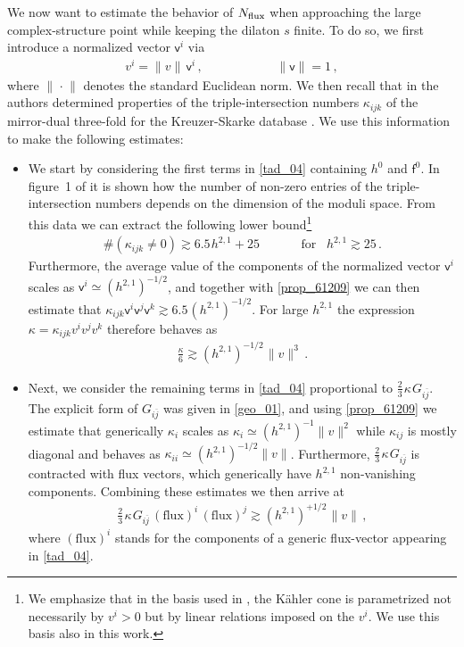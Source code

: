 \documentclass[12pt,a4paper]{article}
\newcommand{\eq}[1]{\begin{equation}
                     \begin{split} #1 \end{split}
                     \end{equation}}
\newcommand{\ov}{\overline}
\newcommand{\op}{\hspace{1pt}}
\numberwithin{equation}{section}
\begin{document}
We now want to estimate the behavior of $N_{\rm flux}$ when approaching the 
large com\-plex-structure point while keeping the dilaton $s$ finite. 
To do so, we first introduce a normalized vector $\mathsf v^i$ via
\eq{
  v^i =  \lVert v \rVert\, \mathsf v^i \,, \hspace{70pt} \lVert \mathsf v \rVert =1\,,
}
where  $\lVert\op \cdot\op\rVert$ denotes  the standard Euclidean norm. 
We then recall that  in \cite{Demirtas:2018akl} the authors determined properties of the 
triple-intersection numbers $\kappa_{ijk}$ of the mirror-dual three-fold 
for the Kreuzer-Skarke database \cite{Kreuzer:2000xy}. We use this information to make the following estimates:
\begin{itemize}


\item We start by considering the first terms in \eqref{tad_04} containing $h^0$ and $\mathsf f^0$. 
In figure~1 of  \cite{Demirtas:2018akl} it is shown
how the number of non-zero entries of the triple-intersection numbers depends 
on the dimension of the moduli space. From this data we can extract the following lower bound\footnote{
We emphasize that in the basis used in \cite{Demirtas:2018akl}, the K\"ahler cone is 
parametrized not necessarily by $v^i>0$ but by linear relations imposed on the $v^i$. We use this basis also in this work.}
\eq{
  \label{prop_61209}
  \#(\kappa_{ijk}\neq 0) \gtrsim 6.5\op h^{2,1} + 25
  \hspace{40pt}\mbox{for}\hspace{10pt} h^{2,1} \gtrsim 25 \,.
}
Furthermore, the average value of the components of the normalized vector $\mathsf v^i$ scales as
$\mathsf v^i \simeq (h^{2,1})^{-1/2}$, and together with 
\eqref{prop_61209} we can then estimate that
$\kappa_{ijk} \mathsf v^i \mathsf v^j \mathsf v^k \gtrsim 6.5 \op (h^{2,1})^{-1/2}$.
For large $h^{2,1}$ the expression $ \kappa = \kappa_{ijk} v^i v^j v^k$ therefore behaves as
\eq{
  \label{scaling_kappa}
  \frac{\kappa}{6}\gtrsim  (h^{2,1})^{-1/2} \op\lVert v \rVert^3 \,.
}


\item Next, we consider the remaining terms in \eqref{tad_04} proportional to
$\tfrac{2}{3}\op\kappa\op G_{i\ov j}$. 
The explicit form of $G_{i\ov j}$ was given in \eqref{geo_01}, and 
using \eqref{prop_61209} we estimate that generically 
$\kappa_i$ scales as
$\kappa_i \simeq (h^{2,1})^{-1} \lVert v \rVert^2$
while $\kappa_{ij}$ is mostly diagonal and behaves as
$\kappa_{ii} \simeq (h^{2,1})^{-1/2} \lVert v \rVert$.
Furthermore, $\tfrac{2}{3}\op\kappa\op G_{i\ov j}$
is contracted with flux vectors, which generically have 
$h^{2,1}$ non-vanishing components. 
Combining these estimates
we then arrive at
\eq{
  \tfrac{2}{3} \op\kappa\op G_{i\ov j}\, (\mbox{flux})^i\,(\mbox{flux})^j \gtrsim  (h^{2,1})^{+1/2} \op\lVert v \rVert \,,
}
where $(\mbox{flux})^i$ stands for the components of a generic flux-vector appearing in \eqref{tad_04}.

\end{itemize}
\end{document}
